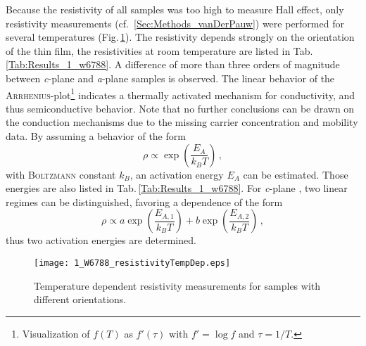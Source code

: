 Because the resistivity of all samples was too high to measure Hall effect, only resistivity measurements (cf.~\ref{Sec:Methods_vanDerPauw}) were performed for several temperatures (Fig.\,\ref{Fig:Results_1_w6788_TdH}).
The resistivity depends strongly on the orientation of the thin film, the resistivities at room temperature are listed in Tab.\,\ref{Tab:Results_1_w6788}.
A difference of more than three orders of magnitude between \textit{c}-plane and \textit{a}-plane samples is observed.
The linear behavior of the \textsc{Arrhenius}-plot\footnote{
    Visualization of $f(T)$ as $f'(\tau)$ with $f'=\log f$ and $\tau=1/T$.
}
indicates a thermally activated mechanism for conductivity, and thus semiconductive behavior.
Note that no further conclusions can be drawn on the conduction mechanisms due to the missing carrier concentration and mobility data.
By assuming a behavior of the form
\begin{equation}
    \rho\propto\exp\left(\frac{E_A}{k_BT}\right)\,,
\end{equation}
with \textsc{Boltzmann} constant $k_B$, an activation energy $E_A$ can be estimated.
Those energies are also listed in Tab.\,\ref{Tab:Results_1_w6788}.
For \textit{c}-plane \cro, two linear regimes can be distinguished, favoring a dependence of the form
\begin{equation}
    \rho\propto a\exp\left(\frac{E_{A,1}}{k_BT}\right)
    +b\exp\left(\frac{E_{A,2}}{k_BT}\right)\,,
\end{equation}
thus two activation energies are determined.
\begin{figure}
    \centering
    \texttt{[image: 1\_W6788\_resistivityTempDep.eps]}
    \caption{
        Temperature dependent resistivity measurements for samples with different orientations.
    }
    \label{Fig:Results_1_w6788_TdH}
\end{figure}